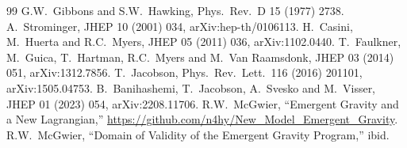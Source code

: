 \documentclass[11pt]{article}
\theoremstyle{definition}
\begin{document}
\begin{thebibliography}{99}
G.W.~Gibbons and S.W.~Hawking,
Phys.\ Rev.\ D 15 (1977) 2738.
A.~Strominger,
JHEP 10 (2001) 034, arXiv:hep-th/0106113.
H.~Casini, M.~Huerta and R.C.~Myers,
JHEP 05 (2011) 036, arXiv:1102.0440.
T.~Faulkner, M.~Guica, T.~Hartman, R.C.~Myers and M.~Van Raamsdonk,
JHEP 03 (2014) 051, arXiv:1312.7856.
T.~Jacobson,
Phys.\ Rev.\ Lett.\ 116 (2016) 201101, arXiv:1505.04753.
B.~Banihashemi, T.~Jacobson, A.~Svesko and M.~Visser,
JHEP 01 (2023) 054, arXiv:2208.11706.
R.W.~McGwier,
``Emergent Gravity and a New Lagrangian,''
\url{https://github.com/n4hy/New_Model_Emergent_Gravity}.
R.W.~McGwier,
``Domain of Validity of the Emergent Gravity Program,'' ibid.
\end{thebibliography}
\end{document}
